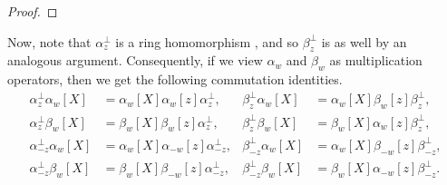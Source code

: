 \documentclass[12pt]{amsart}%
\theoremstyle{remark}
\theoremstyle{definition}
\newcommand{\Z}{\mathbb{Z}}
\begin{document}
\begin{proof}
    \end{proof}

    

    Now, note that $\alpha_z^\perp$ is a ring homomorphism \cite[p.~236-237]{macdonald:1995}, and so $\beta_z^\perp$ is as well by an analogous argument. Consequently, if we view $\alpha_w$ and $\beta_w$ as multiplication operators, then we get the following commutation identities.
    \begin{align*}
            \alpha_z^\perp \alpha_w[X]&=\alpha_w[X]\alpha_w[z]\alpha_z^\perp,&
            \beta_{z}^\perp \alpha_w[X]&=\alpha_w[X]\beta_w[z]\beta_{z}^\perp,\\
            \alpha_z^\perp \beta_w[X]&=\beta_w[X]\beta_w[z]\alpha_z^\perp,&
            \beta_{z}^\perp \beta_w[X]&=\beta_w[X]\alpha_w[z]\beta_{z}^\perp,\\
            \alpha_{-z}^\perp \alpha_w[X]&=\alpha_w[X]\alpha_{-w}[z]\alpha_{-z}^\perp,&
            \beta_{-z}^\perp \alpha_w[X]&=\alpha_w[X]\beta_{-w}[z]\beta_{-z}^\perp,\\
            \alpha_{-z}^\perp \beta_w[X]&=\beta_w[X]\beta_{-w}[z]\alpha_{-z}^\perp,&
            \beta_{-z}^\perp \beta_w[X]&=\beta_w[X]\alpha_{-w}[z]\beta_{-z}^\perp.
        \end{align*}
    
\end{document}
